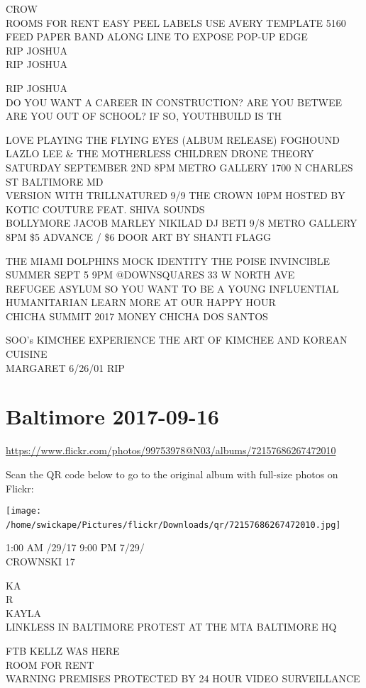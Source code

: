 \documentclass[10pt,letterpaper]{article}
\begin{document}
CROW\\
ROOMS FOR RENT EASY PEEL LABELS USE AVERY TEMPLATE 5160 FEED PAPER BAND ALONG LINE TO EXPOSE POP{-}UP EDGE\\
RIP JOSHUA\\
RIP JOSHUA

RIP JOSHUA\\
DO YOU WANT A CAREER IN CONSTRUCTION?  ARE YOU BETWEE  ARE YOU OUT OF SCHOOL?  IF SO, YOUTHBUILD IS TH

LOVE PLAYING THE FLYING EYES (ALBUM RELEASE) FOGHOUND LAZLO LEE \& THE MOTHERLESS CHILDREN DRONE THEORY SATURDAY SEPTEMBER 2ND 8PM METRO GALLERY 1700 N CHARLES ST BALTIMORE MD\\
VERSION WITH TRILLNATURED 9/9 THE CROWN 10PM HOSTED BY KOTIC COUTURE FEAT. SHIVA SOUNDS\\
BOLLYMORE JACOB MARLEY NIKILAD DJ BETI 9/8 METRO GALLERY 8PM \$5 ADVANCE / \$6 DOOR ART BY SHANTI FLAGG

THE MIAMI DOLPHINS MOCK IDENTITY THE POISE INVINCIBLE SUMMER SEPT 5 9PM @DOWNSQUARES 33 W NORTH AVE\\
REFUGEE ASYLUM SO YOU WANT TO BE A YOUNG INFLUENTIAL HUMANITARIAN LEARN MORE AT OUR HAPPY HOUR\\
CHICHA SUMMIT 2017 MONEY CHICHA DOS SANTOS

SOO's KIMCHEE EXPERIENCE THE ART OF KIMCHEE AND KOREAN CUISINE\\
MARGARET 6/26/01 RIP
\

\section*{Baltimore 2017-09-16}

\url{https://www.flickr.com/photos/99753978@N03/albums/72157686267472010}

Scan the QR code below to go to the original album with full-size photos on Flickr:

\texttt{[image: /home/swickape/Pictures/flickr/Downloads/qr/72157686267472010.jpg]}
\

1:00 AM /29/17 9:00 PM 7/29/\\
CROWNSKI 17

KA\\
R\\
KAYLA\\
LINKLESS IN BALTIMORE PROTEST AT THE MTA BALTIMORE HQ

FTB KELLZ WAS HERE\\
ROOM FOR RENT\\
WARNING PREMISES PROTECTED BY 24 HOUR VIDEO SURVEILLANCE
\end{document}

